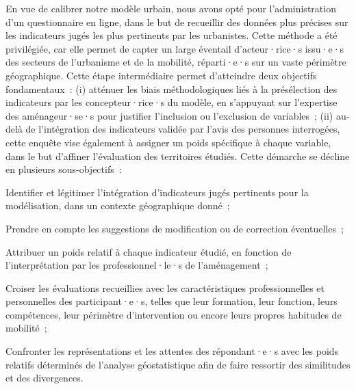 \begin{refsegment}
En vue de calibrer notre modèle urbain, nous avons opté pour l'administration d'un questionnaire en ligne, dans le but de recueillir des données plus précises sur les indicateurs jugés les plus pertinents par les urbanistes. Cette méthode a été privilégiée, car elle permet de capter un large éventail d'acteur·rice·s issu·e·s des secteurs de l'urbanisme et de la mobilité, réparti·e·s sur un vaste périmètre géographique. Cette étape intermédiaire permet d'atteindre deux objectifs fondamentaux~: (i) atténuer les biais méthodologiques liés à la présélection des indicateurs par les concepteur·rice·s du modèle, en s'appuyant sur l'expertise des aménageur·se·s pour justifier l'inclusion ou l'exclusion de variables~; (ii) au-delà de l'intégration des indicateurs validée par l'avis des personnes interrogées, cette enquête vise également à assigner un poids spécifique à chaque variable, dans le but d'affiner l'évaluation des territoires étudiés. Cette démarche se décline en plusieurs sous-objectifs~:
\begin{customitemize}
    \item Identifier et légitimer l'intégration d'indicateurs jugés pertinents pour la modélisation, dans un contexte géographique donné~;
    \item Prendre en compte les suggestions de modification ou de correction éventuelles~;
    \item Attribuer un poids relatif à chaque indicateur étudié, en fonction de l'interprétation par les professionnel·le·s de l'aménagement~;
    \item Croiser les évaluations recueillies avec les caractéristiques professionnelles et personnelles des participant·e·s, telles que leur formation, leur fonction, leurs compétences, leur périmètre d'intervention ou encore leurs propres habitudes de mobilité~;
    \item Confronter les représentations et les attentes des répondant·e·s avec les poids relatifs déterminés de l'analyse géostatistique afin de faire ressortir des similitudes et des divergences.
\end{customitemize}%
 

\end{refsegment}
